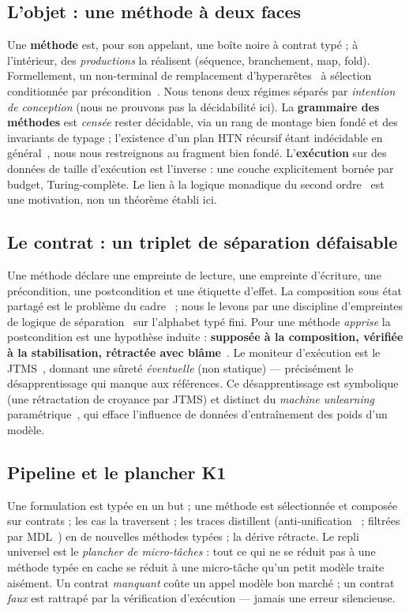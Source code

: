 \documentclass[11pt]{article}
\newcommand{\K}{\textsf{K1}}
\begin{document}
\subsection{L'objet : une méthode à deux faces}
Une \textbf{méthode} est, pour son appelant, une boîte noire à contrat typé ; à l'intérieur, des
\emph{productions} la réalisent (séquence, branchement, map, fold). Formellement, un non-terminal de remplacement
d'hyperarêtes~\cite{habel1992,drewes1997} à sélection conditionnée par précondition~\cite{erol1994}. Nous tenons
deux régimes séparés par \emph{intention de conception} (nous ne prouvons pas la décidabilité ici). La
\textbf{grammaire des méthodes} est \emph{censée} rester décidable, via un rang de montage bien fondé et des
invariants de typage ; l'existence d'un plan HTN récursif étant indécidable en général~\cite{erol1996}, nous nous
restreignons au fragment bien fondé. L'\textbf{exécution} sur des données de taille d'exécution est l'inverse : une
couche explicitement bornée par budget, Turing-complète. Le lien à la logique monadique du second ordre~\cite{courcelle1990} est une motivation, non un
théorème établi ici.

\subsection{Le contrat : un triplet de séparation défaisable}
Une méthode déclare une empreinte de lecture, une empreinte d'écriture, une précondition, une postcondition et une
étiquette d'effet. La composition sous état partagé est le problème du cadre~\cite{mccarthy1969} ; nous le levons
par une discipline d'empreintes de logique de séparation~\cite{ohearn2001,reynolds2002} sur l'alphabet typé fini.
Pour une méthode \emph{apprise} la postcondition est une hypothèse induite : \textbf{supposée à la composition,
vérifiée à la stabilisation, rétractée avec blâme}~\cite{findler2002,bader2018}. Le moniteur d'exécution est le
JTMS~\cite{doyle1979}, donnant une sûreté \emph{éventuelle} (non statique) --- précisément le désapprentissage qui
manque aux références. Ce désapprentissage est symbolique (une rétractation de croyance par JTMS) et distinct du
\emph{machine unlearning} paramétrique~\cite{bourtoule2021}, qui efface l'influence de données d'entraînement des
poids d'un modèle.

\subsection{Pipeline et le plancher \K{}}
Une formulation est typée en un but ; une méthode est sélectionnée et composée sur contrats ; les cas la traversent ;
les traces distillent (anti-unification~\cite{plotkin1970} ; filtrées par MDL~\cite{ellis2021,bowers2023}) en de
nouvelles méthodes typées ; la dérive rétracte. Le repli universel est le \emph{plancher de micro-tâches} : tout ce
qui ne se réduit pas à une méthode typée en cache se réduit à une micro-tâche qu'un petit modèle traite aisément.
Un contrat \emph{manquant} coûte un appel modèle bon marché ; un contrat \emph{faux} est rattrapé par la
vérification d'exécution --- jamais une erreur silencieuse.
\end{document}
